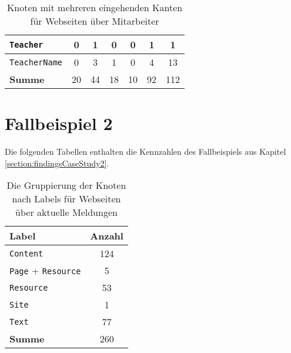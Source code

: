 \begin{table}[!h]
\begin{tabular}{|l|c|c|c|c|c|c|}
                \texttt{Teacher}                               & 0             & 1              & 0               & 0             & 1              & 1             \\ \hline
                \texttt{TeacherName}                           & 0             & 3              & 1               & 0             & 4              & 13            \\ \hline
                \hline
                \textbf{Summe}                        & 20            & 44             & 18              & 10            & 92             & 112           \\ \hline
            \end{tabular}
            \caption{Knoten mit mehreren eingehenden Kanten für Webseiten über Mitarbeiter}
            \label{table:findingsTeachersFiguresSharedNodes}
        \end{table}

    \section{Fallbeispiel 2}
        \label{section:appendixExample2Figures}
        Die folgenden Tabellen enthalten die Kennzahlen des
        Fallbeispiels aus Kapitel \ref{section:findingsCaseStudy2}.

        \begin{table}[!h]
            \centering
            \begin{tabular}{|l|c|}
                \hline
                \textbf{Label}  & \multicolumn{1}{l|}{\textbf{Anzahl}} \\ \hline
                \texttt{Content}         & 124                                  \\ \hline
                \texttt{Page} + \texttt{Resource} & 5                                    \\ \hline
                \texttt{Resource}        & 53                                   \\ \hline
                \texttt{Site}            & 1                                    \\ \hline
                \texttt{Text}            & 77                                   \\ \hline
                \hline
                \textbf{Summe}  & 260                                  \\ \hline
            \end{tabular}
            \caption{Die Gruppierung der Knoten nach Labels für Webseiten über aktuelle Meldungen}
            \label{table:findingsNewsFiguresNodesByLabel}
        \end{table}


